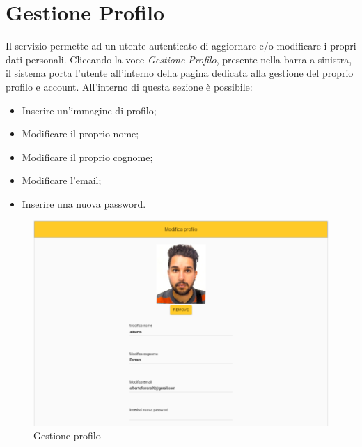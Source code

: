 \newpage
\section{Gestione Profilo}
Il servizio permette ad un utente autenticato di aggiornare e/o modificare i propri dati personali. Cliccando la voce \textit{Gestione Profilo}, presente nella barra a sinistra, il sistema porta l'utente all'interno della pagina dedicata alla gestione del proprio profilo e account. All'interno di questa sezione è possibile:
\begin{itemize}
	\item Inserire un'immagine di profilo;
	\item Modificare il proprio nome;
	\item Modificare il proprio cognome;
	\item Modificare l'email;
	\item Inserire una nuova password.
\end{itemize}

\label{GestioneProfilo}
\begin{figure}[ht]
	\centering
	\includegraphics[scale=0.45]{img/gestione_profilo.png}
	\caption{Gestione profilo}
\end{figure}
\FloatBarrier

